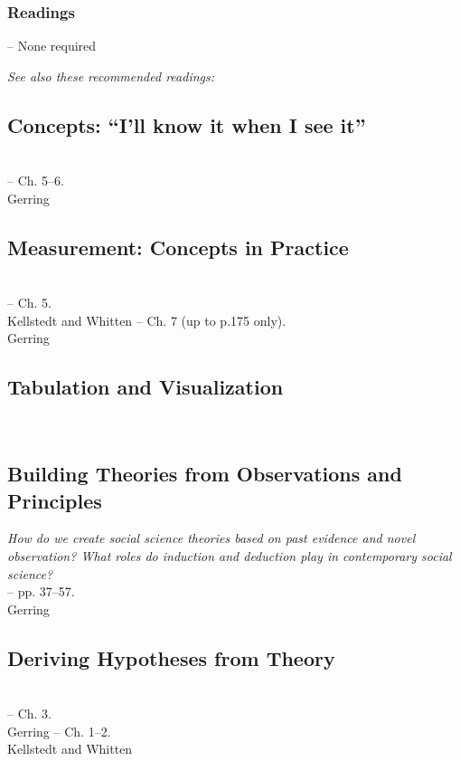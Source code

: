 \documentclass[12pt,a4paper]{article}
\newcommand{\lecture}[3][\DefaultOpt]{%
  \def\DefaultOpt{#2}%
  \clearpage\subsection[#1]{#2}\emph{#3}\vspace{.25em}\\
}
\newcommand{\reading}[2][]{\noindent -- {#1}\bibentry{#2}.\vspace{.25em}\\}
\newcommand{\textbook}[2][]{\noindent -- {#1}#2.\vspace{.25em}\\}
\newcommand{\seealso}{\noindent \emph{See also these recommended readings:}}
\begin{document}
\subsubsection*{Readings}

-- None required

\seealso



\lecture{Concepts: ``I'll know it when I see it''}{}
\textbook{Ch. 5--6}{Gerring}



\lecture{Measurement: Concepts in Practice}{}
\textbook{Ch. 5}{Kellstedt and Whitten}
\textbook{Ch. 7 (up to p.175 only)}{Gerring}

\lecture{Tabulation and Visualization}{}


\lecture{Building Theories from Observations and Principles}{How do we create social science theories based on past evidence and novel observation? What roles do induction and deduction play in contemporary social science?}
\textbook{pp. 37--57}{Gerring}

\lecture{Deriving Hypotheses from Theory}{} %
\textbook{Ch. 3}{Gerring}
\textbook{Ch. 1--2}{Kellstedt and Whitten}

\end{document}
